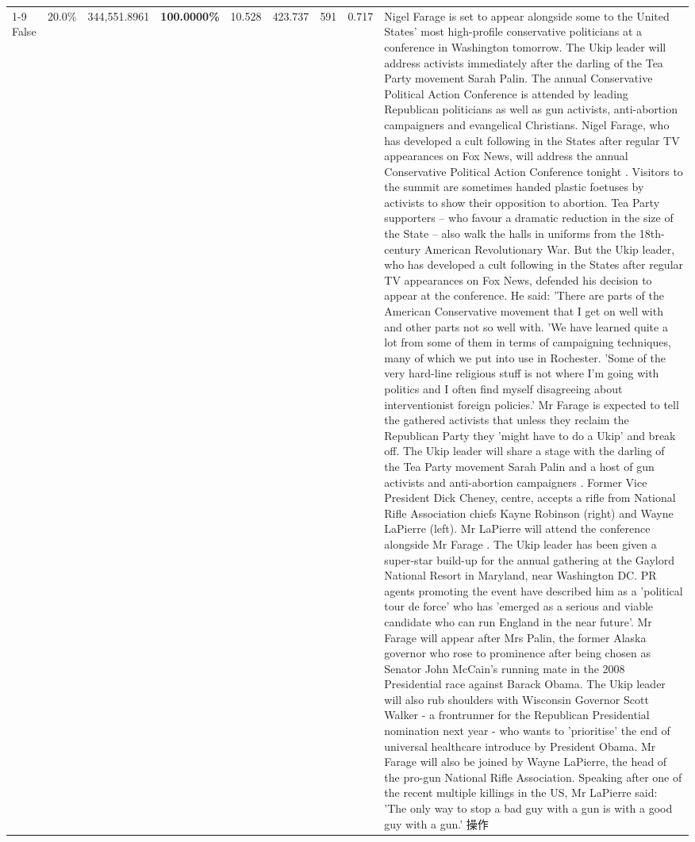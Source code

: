 \begin{table}[H]
\begin{tabular}{lllrlllll}
\cline{1-9}
False & 20.0\% & 344,551.8961 & \bfseries \color{red} 100.0000\% & 10.528 & 423.737 & 591 & 0.717 & Nigel Farage is set to appear alongside some to the United States' most high-profile conservative politicians at a conference in Washington tomorrow. The Ukip leader will address activists immediately after the darling of the Tea Party movement Sarah Palin. The annual Conservative Political Action Conference is attended by leading Republican politicians as well as gun activists, anti-abortion campaigners and evangelical Christians. Nigel Farage, who has developed a cult following in the States after regular TV appearances on Fox News, will address the annual Conservative Political Action Conference tonight . Visitors to the summit are sometimes handed plastic foetuses by activists to show their opposition to abortion. Tea Party supporters – who favour a dramatic reduction in the size of the State – also walk the halls in uniforms from the 18th-century American Revolutionary War. But the Ukip leader, who has developed a cult following in the States after regular TV appearances on Fox News, defended his decision to appear at the conference. He said: 'There are parts of the American Conservative movement that I get on well with and other parts not so well with. 'We have learned quite a lot from some of them in terms of campaigning techniques, many of which we put into use in Rochester. 'Some of the very hard-line religious stuff is not where I'm going with politics and I often find myself disagreeing about interventionist foreign policies.' Mr Farage is expected to tell the gathered activists that unless they reclaim the Republican Party they 'might have to do a Ukip' and break off. The Ukip leader will share a stage with the darling of the Tea Party movement Sarah Palin and a host of gun activists and anti-abortion campaigners . Former Vice President Dick Cheney, centre, accepts a rifle from National Rifle Association chiefs Kayne Robinson (right) and Wayne LaPierre (left). Mr LaPierre will attend the conference alongside Mr Farage . The Ukip leader has been given a super-star build-up for the annual gathering at the Gaylord National Resort in Maryland, near Washington DC. PR agents promoting the event have described him as a 'political tour de force' who has 'emerged as a serious and viable candidate who can run England in the near future'. Mr Farage will appear after Mrs Palin, the former Alaska governor who rose to prominence after being chosen as Senator John McCain's running mate in the 2008 Presidential race against Barack Obama. The Ukip leader will also rub shoulders with Wisconsin Governor Scott Walker - a frontrunner for the Republican Presidential nomination next year - who wants to 'prioritise' the end of universal healthcare introduce by President Obama. Mr Farage will also be joined by Wayne LaPierre, the head of the pro-gun National Rifle Association. Speaking after one of the recent multiple killings in the US, Mr LaPierre said: 'The only way to stop a bad guy with a gun is with a good guy with a gun.' 操作 \\

\end{tabular}
\end{table}
